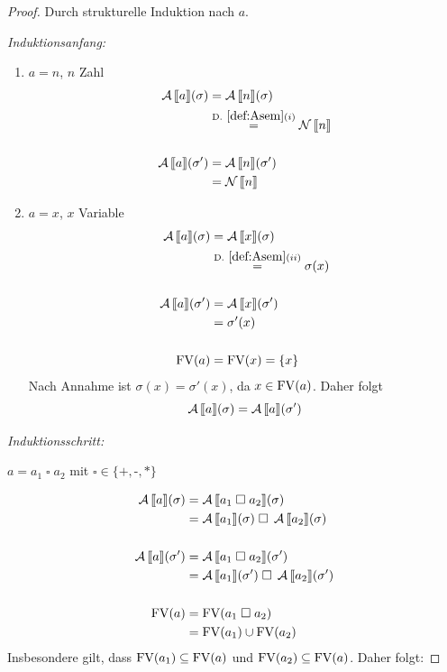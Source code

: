 \begin{proof}
    Durch strukturelle Induktion nach $a$.

    \emph{Induktionsanfang:}
    \begin{enumerate}
        \item $a = n$, $n$ Zahl
            \begin{align*}
                \A\lsem a \rsem(\sigma) & = \A\lsem n \rsem(\sigma) \\
                & \overset{\defrefshort{def:Asem}(i)}{=} \N\lsem n \rsem \\
                \\
                \A\lsem a \rsem(\sigma') & = \A\lsem n \rsem(\sigma') \\
                & = \N\lsem n \rsem
            \end{align*}

        \item $a = x$, $x$ Variable
            \begin{align*}
                \A\lsem a \rsem(\sigma) & = \A\lsem x \rsem(\sigma) \\
                & \overset{\defrefshort{def:Asem}(ii)}{=} \sigma(x) \\
                \\
                \A\lsem a \rsem(\sigma') & = \A\lsem x \rsem(\sigma') \\
                & = \sigma'(x) \\
                \\
                \FV(a) & = \FV(x) = \{ x \}
            \end{align*}
            Nach Annahme ist $\sigma(x) = \sigma'(x)$, da $x \in \operatorname{FV}(a)$. Daher folgt
            \[
            \operatorname{\mathcal{A}}\mathrm{[}\kern-.14em\mathrm{[} a \mathrm{]}\kern-.14em\mathrm{]}(\sigma) = \operatorname{\mathcal{A}}\mathrm{[}\kern-.14em\mathrm{[} a \mathrm{]}\kern-.14em\mathrm{]}(\sigma')
            \]
    \end{enumerate}

    \emph{Induktionsschritt:}

    $a = a_1 \;\square\; a_2$ mit $\square \in \{ \texttt{+}, \texttt{-}, \texttt{*} \}$

    \begin{align*}
        \A\lsem a \rsem(\sigma) & = \A\lsem a_1 \;\square\; a_2 \rsem(\sigma) \\
        & = \A\lsem a_1 \rsem(\sigma) \;\square\; \A\lsem a_2 \rsem(\sigma) \\
        \\
        \A\lsem a \rsem(\sigma') & = \A\lsem a_1 \;\square\; a_2 \rsem(\sigma') \\
        & = \A\lsem a_1 \rsem(\sigma') \;\square\; \A\lsem a_2 \rsem(\sigma') \\
        \\
        \FV(a) & = \FV(a_1 \;\square\; a_2) \\
        & = \FV(a_1) \cup \FV(a_2)
    \end{align*}
    Insbesondere gilt, dass $\operatorname{FV}(a_1) \subseteq \operatorname{FV}(a)$ und $\operatorname{FV}(a_2) \subseteq \operatorname{FV}(a)$. Daher folgt:


\end{proof}
